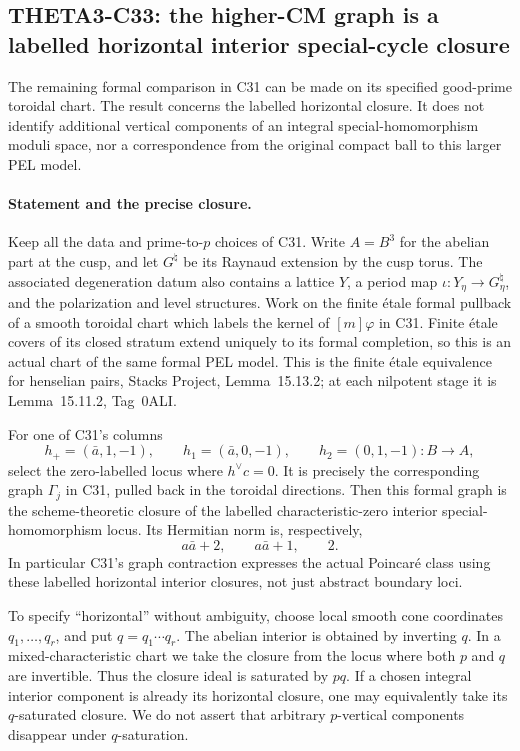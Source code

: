 \subsection{THETA3-C33: the higher-CM graph is a labelled horizontal interior special-cycle closure}\label{C33}

The remaining formal comparison in C31 can be made on its
specified good-prime toroidal chart. The result concerns the
labelled horizontal closure. It does not identify additional
vertical components of an integral special-homomorphism
moduli space, nor a correspondence from the original compact
ball to this larger PEL model.

\paragraph{Statement and the precise closure.}
Keep all the data and prime-to-$p$ choices of C31. Write
$A=B^3$ for the abelian part at the cusp, and let
$G^{\natural}$ be its Raynaud extension by the cusp torus.
The associated degeneration datum also contains a lattice
$Y$, a period map $\iota:Y_\eta\to G^{\natural}_\eta$,
and the polarization and level structures. Work on the
finite \'etale formal pullback of a smooth toroidal chart
which labels the kernel of $[m]\varphi$ in C31. Finite
\'etale covers of its closed stratum extend uniquely to
its formal completion, so this is an actual chart of the
same formal PEL model.
This is the finite \'etale equivalence for henselian
pairs, Stacks Project, Lemma~15.13.2; at each
nilpotent stage it is Lemma~15.11.2, Tag~0ALI.

For one of C31's columns
\[
 h_+=(\bar a,1,-1),\qquad
 h_1=(\bar a,0,-1),\qquad h_2=(0,1,-1):B\longrightarrow A,
                                                        \tag{C33a}
\]
select the zero-labelled locus where $h^\vee c=0$.
It is precisely the corresponding graph $\Gamma_j$ in
C31, pulled back in the toroidal directions. Then this
formal graph is the scheme-theoretic closure of the
labelled characteristic-zero interior special-homomorphism
locus. Its Hermitian norm is, respectively,
\[
              a\bar a+2,\qquad a\bar a+1,\qquad 2.
                                                        \tag{C33b}
\]
In particular C31's graph contraction expresses the actual
Poincar\'e class using these labelled horizontal interior
closures, not just abstract boundary loci.

To specify ``horizontal'' without ambiguity, choose local
smooth cone coordinates $q_1,\ldots,q_r$, and put
$q=q_1\cdots q_r$. The abelian interior is obtained by
inverting $q$. In a mixed-characteristic chart we take
the closure from the locus where both $p$ and $q$ are
invertible. Thus the closure ideal is saturated by $pq$.
If a chosen integral interior component is already its
horizontal closure, one may equivalently take its
$q$-saturated closure. We do not assert that arbitrary
$p$-vertical components disappear under $q$-saturation.

